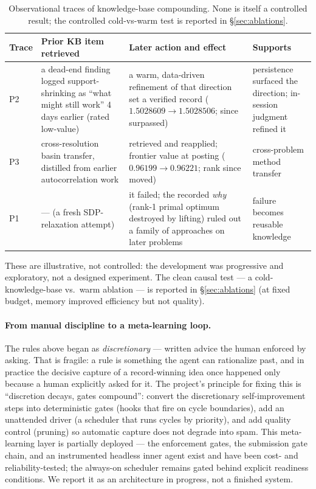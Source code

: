\documentclass[11pt]{article}
\newcommand{\src}[1]{}
\begin{document}
\begin{table}[htbp]
\centering\small
\caption{Observational traces of knowledge-base compounding. None is itself a controlled
result; the controlled cold-vs-warm test is reported in \S\ref{sec:ablations}.}
\label{tab:traces}
\begin{tabularx}{\textwidth}{l >{\hsize=1.2\hsize}X >{\hsize=1.2\hsize}X >{\hsize=0.6\hsize}X}
\toprule
Trace & Prior KB item retrieved & Later action and effect & Supports \\
\midrule
P2 & a dead-end finding logged support-shrinking as ``what might still work'' 4 days earlier (rated low-value) &
  a warm, data-driven refinement of that direction set a verified record
  ($1.5028609\to 1.5028506$; since surpassed) & persistence surfaced the direction; in-session judgment refined it \\
P3 & cross-resolution basin transfer, distilled from earlier autocorrelation work &
  retrieved and reapplied; frontier value at posting ($0.96199\to 0.96221$; rank since
  moved) & cross-problem method transfer \\
P1 & --- (a fresh SDP-relaxation attempt) &
  it failed; the recorded \emph{why} (rank-1 primal optimum destroyed by lifting) ruled out
  a family of approaches on later problems & failure becomes reusable knowledge \\
\bottomrule
\end{tabularx}
\end{table}

These are illustrative, not controlled: the development was progressive and exploratory, not a
designed experiment. The clean causal test --- a cold-knowledge-base vs.\ warm ablation --- is
reported in \S\ref{sec:ablations} (at fixed budget, memory improved efficiency but not
quality). \src{docs/agent/cycle-log.md, docs/agent/metrics.md, findings/sdp-relaxation-uselessness.md}

\paragraph{From manual discipline to a meta-learning loop.}
The rules above began as \emph{discretionary} --- written advice the human enforced by
asking. That is fragile: a rule is something the agent can rationalize past, and in practice
the decisive capture of a record-winning idea once happened only because a human explicitly
asked for it. The project's principle for fixing this is ``discretion decays, gates
compound'': convert the discretionary self-improvement steps into deterministic gates (hooks
that fire on cycle boundaries), add an unattended driver (a scheduler that runs cycles by
priority), and add quality control (pruning) so automatic capture does not degrade into spam.
This meta-learning layer is partially deployed --- the enforcement gates, the submission gate
chain, and an instrumented headless inner agent exist and have been cost- and
reliability-tested; the always-on scheduler remains gated behind explicit readiness
conditions. We report it as an architecture in progress, not a finished system.
\src{docs/agent/meta-learning-automation.md, docs/agent/unattended-runbook.md, src/einstein/meta\_loop/}
\end{document}
